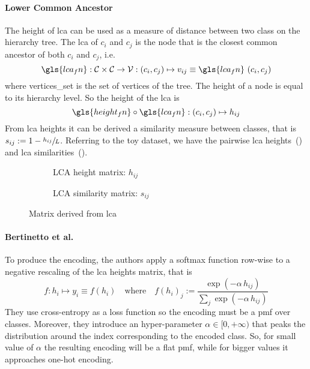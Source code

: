 \paragraph{Lower Common Ancestor}
The height of \acrfull{lca} can be used as a measure of distance between two class on the hierarchy tree. The \acrshort{lca} of $c_i$ and $c_j$ is the node that is the closest common ancestor of both $c_i$ and $c_j$, i.e.\
\begin{equation}
  \gls{lca_fn} : \mathcal{C} \times \mathcal{C} \to \mathcal{V}:
  \left(c_i, c_j\right) \mapsto v_{ij} \equiv
  \gls{lca_fn} \, \left(c_i, c_j\right)
  \label{eq:lca}
\end{equation}
where \gls{vertices_set} is the set of vertices of the tree. The height of a node is equal to its hierarchy level.
So the height of the \acrshort{lca} is
\begin{equation}
  \gls{height_fn} \circ \gls{lca_fn} : \left(c_i, c_j\right) \mapsto h_{ij}
  \label{eq:lca-height}
\end{equation}
From \acrshort{lca} heights it can be derived a similarity measure between classes, that is $s_{ij} := 1 - \sfrac{h_{ij}}{L}$.
Referring to the toy dataset, we have the pairwise \acrshort{lca} heights~(\Cref{fig:03/lca-height-matrix}) and \acrshort{lca} similarities~().
\begin{figure}[htbp]
  \begin{subfigure}{0.45\textwidth}
    \caption{LCA height matrix: $h_{ij}$}
    \label{fig:03/lca-height-matrix}
  \end{subfigure}
  \begin{subfigure}{0.45\textwidth}
    \caption{LCA similarity matrix: $s_{ij}$}
    \label{fig:03/lca-similarity-matrix}
  \end{subfigure}
  \caption{Matrix derived from \acrlong{lca}}
\end{figure}

\paragraph{Bertinetto et al.~\cite{MakingBetterMBertin2019}}\label{par:encoding-mbm} To produce the encoding, the authors apply a softmax function row-wise to a negative rescaling of the \acrshort{lca} heights matrix, that is
\begin{equation}
  f : h_i \mapsto y_i \equiv f(h_i)
  \quad \textrm{where} \quad
  f (h_i)_j := \frac{\exp \left({-\alpha \, h_{ij}}\right)}
  {\sum_j \exp\left({-\alpha \, h_{ij}}\right)}
  \label{eq:mbm-hierarchical-encoding}
\end{equation}
They use cross-entropy as a loss function so the encoding must be a \acrshort{pmf} over classes.
Moreover, they introduce an hyper-parameter $\alpha \in [0, +\infty)$ that peaks the distribution around the index corresponding to the encoded class. So, for small value of $\alpha$ the resulting encoding will be a flat \acrshort{pmf}, while for bigger values it approaches one-hot encoding.

